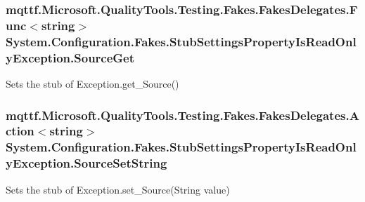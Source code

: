 \hypertarget{class_system_1_1_configuration_1_1_fakes_1_1_stub_settings_property_is_read_only_exception_a07f9c06e02c5347b6530ad03b924bab5}{
\subsubsection[{Source\-Get}]{\setlength{\rightskip}{0pt plus 5cm}mqttf.\-Microsoft.\-Quality\-Tools.\-Testing.\-Fakes.\-Fakes\-Delegates.\-Func$<$string$>$ System.\-Configuration.\-Fakes.\-Stub\-Settings\-Property\-Is\-Read\-Only\-Exception.\-Source\-Get}}\label{class_system_1_1_configuration_1_1_fakes_1_1_stub_settings_property_is_read_only_exception_a07f9c06e02c5347b6530ad03b924bab5}


Sets the stub of Exception.\-get\-\_\-\-Source()

\hypertarget{class_system_1_1_configuration_1_1_fakes_1_1_stub_settings_property_is_read_only_exception_a0942d1f1546bae881179af76c8af79b4}{
\subsubsection[{Source\-Set\-String}]{\setlength{\rightskip}{0pt plus 5cm}mqttf.\-Microsoft.\-Quality\-Tools.\-Testing.\-Fakes.\-Fakes\-Delegates.\-Action$<$string$>$ System.\-Configuration.\-Fakes.\-Stub\-Settings\-Property\-Is\-Read\-Only\-Exception.\-Source\-Set\-String}}\label{class_system_1_1_configuration_1_1_fakes_1_1_stub_settings_property_is_read_only_exception_a0942d1f1546bae881179af76c8af79b4}


Sets the stub of Exception.\-set\-\_\-\-Source(\-String value)

